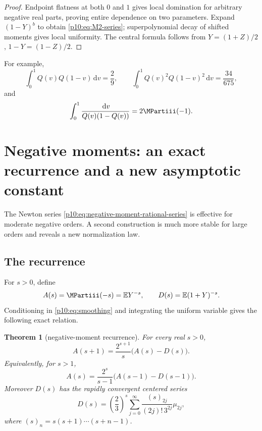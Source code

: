 \documentclass[11pt,oneside]{article}
\newtheorem{theorem}{Theorem}[section]
\theoremstyle{definition}
\theoremstyle{remark}
\newcommand{\Q}{Q}
\newcommand{\E}{\mathbb E}
\newcommand{\dd}{\,\mathrm d}
\newcommand{\1}{\mathbf 1}
\begin{document}
\begin{proof}
Endpoint flatness at both \(0\) and \(1\) gives local domination for arbitrary negative
real parts, proving entire dependence on two parameters.  Expand \((1-Y)^b\) to obtain
\cref{p10:eq:M2-series}; superpolynomial decay of shifted moments gives local uniformity.
The central formula follows from \(Y=(1+Z)/2\), \(1-Y=(1-Z)/2\).
\end{proof}

For example,
\begin{equation}\label{p10:eq:M2-examples}
 \int_0^1\Q(v)\Q(1-v)\dd v=\frac29,
 \qquad
 \int_0^1\Q(v)^2\Q(1-v)^2\dd v=\frac{34}{675},
\end{equation}
and
\begin{equation}\label{p10:eq:M2-negative-example}
 \int_0^1\frac{\dd v}{\Q(v)(1-\Q(v))}=2\MPartiii(-1).
\end{equation}

\section{Negative moments: an exact recurrence and a new asymptotic constant}

The Newton series \cref{p10:eq:negative-moment-rational-series} is effective for moderate
negative orders.  A second construction is much more stable for large orders and reveals
a new normalization law.

\subsection{The recurrence}

For \(s>0\), define
\begin{equation}\label{p10:eq:A-D-def}
 A(s)=\MPartiii(-s)=\E Y^{-s},
 \qquad
 D(s)=\E(1+Y)^{-s}.
\end{equation}
Conditioning in \cref{p10:eq:smoothing} and integrating the uniform variable gives the
following exact relation.

\begin{theorem}[negative-moment recurrence]\label{p10:thm:negative-recurrence}
For every real \(s>0\),
\begin{equation}\label{p10:eq:negative-recurrence}
 A(s+1)=\frac{2^{s+1}}s\bigl(A(s)-D(s)\bigr).
\end{equation}
Equivalently, for \(s>1\),
\begin{equation}\label{p10:eq:negative-recurrence-shifted}
 A(s)=\frac{2^s}{s-1}\bigl(A(s-1)-D(s-1)\bigr).
\end{equation}
Moreover \(D(s)\) has the rapidly convergent centered series
\begin{equation}\label{p10:eq:D-centered-series}
 D(s)=\left(\frac23\right)^s
 \sum_{j=0}^{\infty}
 \frac{(s)_{2j}}{(2j)!\,3^{2j}}\mu_{2j},
\end{equation}
where \((s)_n=s(s+1)\cdots(s+n-1)\).
\end{theorem}
\end{document}

